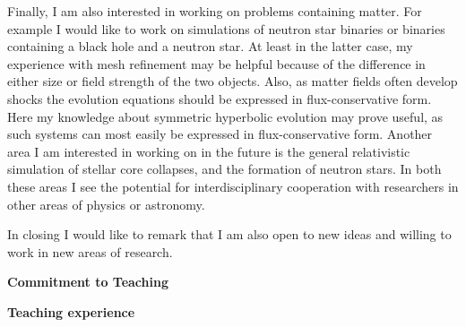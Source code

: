 \documentclass[11pt]{article}
\begin{document}
\begin{spacing}{0.95}
Finally, I am also interested in working on problems containing matter. For
example I would like to work on simulations of neutron star binaries or
binaries containing a black hole and a neutron star. At least in the latter
case, my experience with mesh refinement may be helpful because of the
difference in either size or field strength of the two objects.  Also, as
matter fields often develop shocks the evolution equations should be
expressed in flux-conservative form. Here my knowledge about symmetric
hyperbolic evolution may prove useful, as such systems can most easily be
expressed in flux-conservative form. Another area I am interested in working 
on in the future is the general relativistic simulation of stellar 
core collapses, and the formation of neutron stars. 
In both these areas I see the
potential for interdisciplinary cooperation with researchers in other areas
of physics or astronomy.



In closing I would like to remark that I am also open to new ideas
and willing to work in new areas of research.



\bigskip
\bigskip
\noindent
\centerline{\bf \large Commitment to Teaching}
\medskip %

\noindent
{\bf Teaching experience }
\smallskip


\end{spacing}
\end{document}

